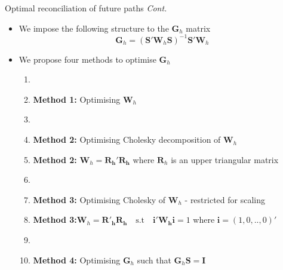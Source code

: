 \documentclass[11pt,xcolor=dvipsnames,table]{beamer} %
\begin{document}
\begin{frame}{Optimal reconciliation of future paths \textit{Cont.}}
\begin{itemize}[<+-| alert@+>]
\item We impose the following structure to the $\bm{G}_h$ matrix
\begin{equation}\label{eq:2}
\bm{G}_h=\left(\bm{S}'\bm{W}_h\bm{S}\right)^{-1}{\bm S'}\bm{W}_h
\end{equation}
\item We propose four methods to optimise $\bm{G}_h$
\begin{enumerate}
	\item[]
	\item[] \textbf{\color{Maroon}Method 1:} Optimising $\bm{W}_h$
	\item[] 
	\item[] \textbf{\color{Maroon}Method 2:} Optimising Cholesky decomposition of $\bm{W}_h$
	\item[] \textbf{\color{White}Method 2:} $\bm{W}_h=\bm{R_h'R_h}$ where $\bm{R}_h$ is an upper triangular matrix 
	\item[]
	\item[] \textbf{\color{Maroon}Method 3:} Optimising Cholesky of $\bm{W}_h$ - restricted for scaling
	\item[] \textbf{\color{White}Method 3:}$\bm{W}_h=\bm{R'_hR_h} \quad \text{s.t} \quad \bm{i'W_hi}=1$ where $\bm{i}=(1,0,..,0)'$
	\item[] 
	\item[] \textbf{\color{Maroon}Method 4:} Optimising $\bm{G}_h$ such that $\bm{G}_h\bm{S=I}$
	
\end{enumerate}
\end{itemize}
\end{frame}

\end{document}
